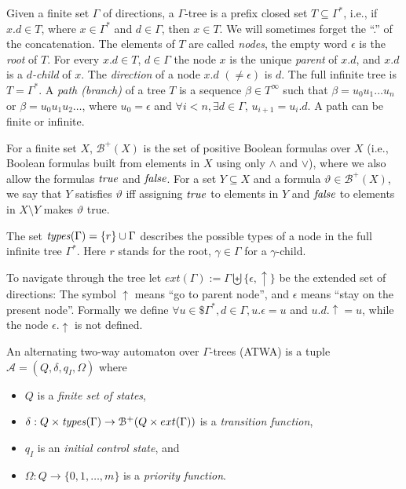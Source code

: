 \documentclass[a4paper,UKenglish,cleveref, autoref, thm-restate]{lipics-v2021}
\begin{document}
Given a finite set $\Gamma$ of directions, a $\Gamma$-tree is a prefix closed set 
$T  \subseteq \Gamma^*$,
i.e., if $x.d  \in  T$, where 
$x  \in  \Gamma^*$ and $d  \in  \Gamma $, then $x  \in  T $. 
We will sometimes forget the “.” of the concatenation. 
The elements of $T$ are called {\em nodes}, the
 empty word  $\epsilon$
  is the {\em root} of $T $. For every $x.d  \in  T$, $d  \in  \Gamma$ the node $x$ is the
unique {\em parent} of $x.d$, and $x.d$ is a {\em $d$-child} of $x$. The {\em direction} of a node $x.d$
$( \neq   \epsilon )$ 
is $d$. 
The full infinite tree is 
$T = \Gamma^*$. A {\em path (branch)} of a tree $T$ is
a sequence  $\beta   \in  T^{\infty}$  such that 
$ \beta  = u_0 u_1 \ldots u_n$ or 
$ \beta  = u_0 u_1 u_2 \ldots$, where
$u_0 =  \epsilon$  and
 $\forall i < n,  \exists d  \in  \Gamma$, $u_{i+1} = u_i.d$. 
 A path can be finite or infinite.



For a finite set $X$, $\mathcal{B}^+ (X)$ is the set of positive Boolean formulas
over $X$ (i.e., Boolean formulas built from elements in $X$ using only $\wedge$ and $\vee$),
where we also allow the formulas $\text{\textit{true}}$ and $\text{\textit{false}}$. For a set $Y  \subseteq  X$ and a
formula $ \vartheta   \in  \mathcal{B}^+ (X)$, we say that $Y$ satisfies $ \vartheta$  iff assigning $\text{\textit{true}}$ to elements in
$Y$ and $\text{\textit{false}}$ to elements in $X \setminus Y$ makes  $\vartheta $ true.

The set $\text{\textit{types}}(\Gamma) = \{r \} \cup \Gamma$ 
describes the possible types of a node in the full infinite tree $\Gamma^*$. 
Here $r$ stands for the root, $\gamma \in \Gamma$ for a $\gamma$-child.

To navigate through the tree let $ext(\Gamma ) := \Gamma \biguplus \{ \epsilon , \uparrow \}$ be the extended set of directions: The symbol $\uparrow$ means “go to parent node”, 
and  $\epsilon$  means “stay on the present
node”. Formally we define $ \forall u  \in \$ \Gamma^* , d  \in  \Gamma, u.\epsilon  = u$ and $u.d. \! \uparrow= u$, while the node 
$ \epsilon . \! \uparrow $ is not defined.




\begin{definition}
An alternating two-way automaton over
 $\Gamma$-trees (ATWA) is a tuple
$\mathcal{A} = (Q,  \delta , q_I , 
\Omega)$ where
\begin{itemize}
\item $Q$ is a {\em finite set of states},
\item $\delta  : Q  \times  
%
\text{\textit{types}}(\Gamma)
  \to  \mathcal{B}^+ (Q \times ext(\Gamma))$ is a {\em transition function},
\item $q_I$ is an {\em initial control state}, and
\item $\Omega: Q \to \{ 0, 1, \ldots, m\}$ is a {\em priority function}.
\end{itemize}
\end{definition}
\end{document}
